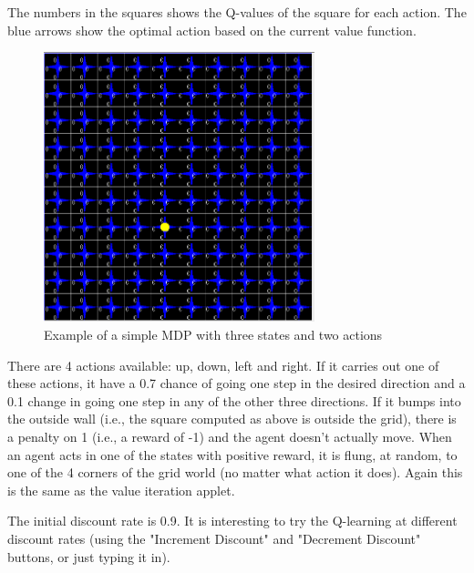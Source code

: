The numbers in the squares shows the Q-values of the square for each action. The blue arrows show the optimal action based on the current value function.

\begin{figure}
\centering
\includegraphics[width=0.7\textwidth]{./images/grid1.png}
\caption{Example of a simple MDP with three states and two actions}
\label{fig:mdp}
\end{figure}



There are 4 actions available: up, down, left and right. If it carries out one of these actions, it have a 0.7 chance of going one step in the desired direction and a 0.1 change in going one step in any of the other three directions. If it bumps into the outside wall (i.e., the square computed as above is outside the grid), there is a penalty on 1 (i.e., a reward of -1) and the agent doesn't actually move. When an agent acts in one of the states with positive reward, it is flung, at random, to one of the 4 corners of the grid world (no matter what action it does). Again this is the same as the value iteration applet.

The initial discount rate is 0.9. It is interesting to try the Q-learning at different discount rates (using the "Increment Discount" and "Decrement Discount" buttons, or just typing it in).



